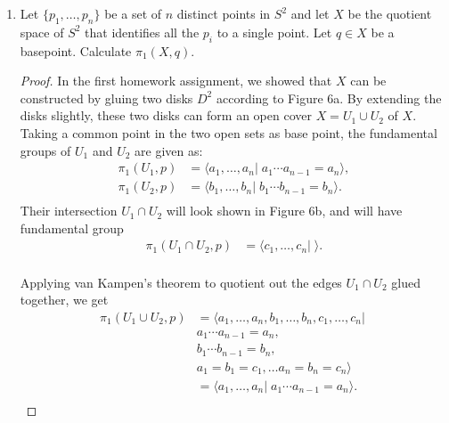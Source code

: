 \documentclass{article}
\begin{document}
\begin{enumerate}[label={\bf Q\arabic*:}]
  \item Let $\{p_1,\ldots,p_n\}$ be a set of $n$ distinct points in $S^2$
    and let $X$ be the quotient space of $S^2$ that identifies all the
    $p_i$ to a single point. Let $q\in X$ be a basepoint. Calculate
    $\pi_1(X,q)$.

    \begin{proof}
      In the first homework assignment, we showed that $X$ can be
      constructed by gluing two disks $D^2$ according to Figure 6a. By
      extending the disks slightly, these two disks can form an open cover
      $X=U_1\cup U_2$ of $X$. Taking a common point in the two open sets as
      base point, the fundamental groups of $U_1$ and $U_2$ are given as:
      \begin{align*}
        \pi_1(U_1,p) &= \langle a_1,\ldots,a_n|\; a_1\cdots
          a_{n-1}=a_n\rangle, \\
        \pi_1(U_2,p) &= \langle b_1,\ldots,b_n|\; b_1\cdots
          b_{n-1}=b_n\rangle. \\
      \end{align*}
      Their intersection $U_1\cap U_2$ will look shown in Figure 6b, and
      will have fundamental group 
      \begin{align*}
        \pi_1(U_1\cap U_2,p) &= \langle c_1,\ldots,c_n|\; \rangle. \\
      \end{align*}

      Applying van Kampen's theorem to quotient out the edges $U_1\cap U_2$
      glued together, we get
      \begin{align*}
        \pi_1(U_1\cup U_2,p)  &= \langle
          a_1,\ldots,a_n,b_1,\ldots,b_n,c_1,\ldots,c_n|\; \\
          & a_1\cdots a_{n-1}=a_n, \\
          & b_1\cdots b_{n-1}=b_n, \\
          & a_1=b_1=c_1,\ldots a_n=b_n=c_n\rangle \\
          &= \langle a_1,\ldots,a_n|\; a_1\cdots a_{n-1}=a_n\rangle. \\
      \end{align*}
    \end{proof}
\end{enumerate}
\end{document}
